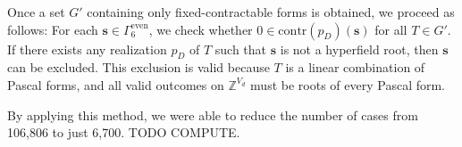 Once a set \( G' \) containing only fixed-contractable forms is obtained, we proceed as follows: For each \( \mathbf{s} \in \Gamma^{\mathrm{even}}_6 \), we check whether \( 0 \in \mathrm{contr}(p_D)(\mathbf{s}) \) for all \( T \in G' \). If there exists any realization \( p_D \) of \( T \) such that \( \mathbf{s} \) is not a hyperfield root, then \( \mathbf{s} \) can be excluded. This exclusion is valid because \( T \) is a linear combination of Pascal forms, and all valid outcomes on \( \mathbb{Z}^{V_d} \) must be roots of every Pascal form. 

By applying this method, we were able to reduce the number of cases from 106,806 to just 6,700. TODO COMPUTE.
